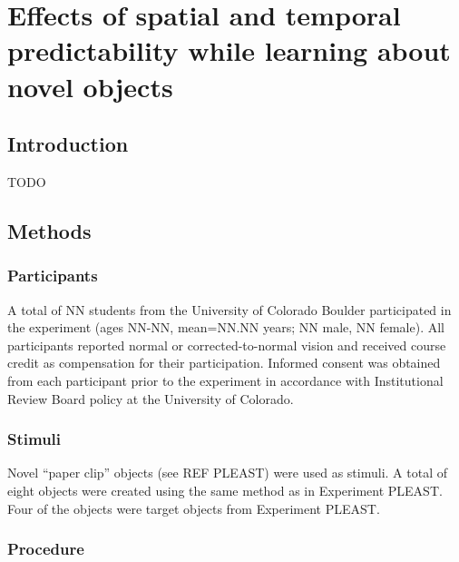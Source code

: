 \documentclass[dwyatte_dissertation.tex]{subfiles}
\begin{document}
\chapter{Effects of spatial and temporal predictability while learning about novel objects}

\section{Introduction}
TODO

\section{Methods}

\subsection{Participants}
A total of NN students from the University of Colorado Boulder participated in the experiment (ages NN-NN, mean=NN.NN years; NN male, NN female). All participants reported normal or corrected-to-normal vision and received course credit as	compensation for their participation. Informed consent was obtained from each participant prior to the experiment in accordance with Institutional Review Board policy at the University of Colorado.

\subsection{Stimuli}
Novel ``paper clip'' objects (see REF PLEAST) were used as stimuli. A total of eight objects were created using the same method as in Experiment PLEAST. Four of the objects were target objects from Experiment PLEAST.

\subsection{Procedure}



\end{document}
